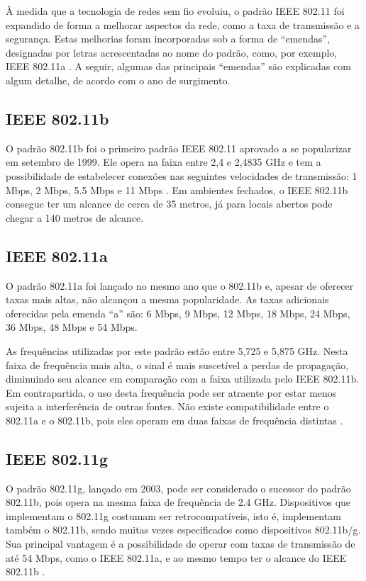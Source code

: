 À medida que a tecnologia de redes sem fio evoluiu, o padrão IEEE 802.11 foi expandido de forma a melhorar aspectos da rede, como a taxa de transmissão e a segurança. Estas melhorias foram incorporadas sob a forma de ``emendas'', designadas por letras acrescentadas ao nome do padrão, como, por exemplo, IEEE 802.11a \cite{fluminense2010}. A seguir, algumas das principais ``emendas'' são explicadas com algum detalhe, de acordo com o ano de surgimento.

\subsection{IEEE 802.11b}
\label{subsec:802-11b}

O padrão 802.11b foi o primeiro padrão IEEE 802.11 aprovado a se popularizar em setembro de 1999. Ele opera na faixa entre 2,4 e 2,4835 GHz e tem a possibilidade de estabelecer conexões nas seguintes velocidades de transmissão: 1 Mbps, 2 Mbps, 5.5 Mbps e 11 Mbps \cite{moraes2010,fluminense2010}. Em ambientes fechados, o IEEE 802.11b consegue ter um alcance de cerca de 35 metros, já para locais abertos pode chegar a 140 metros de alcance.

\subsection{IEEE 802.11a}
\label{802-11a}

O padrão 802.11a foi lançado no mesmo ano que o 802.11b e, apesar de oferecer taxas mais altas, não alcançou a mesma popularidade. As taxas adicionais oferecidas pela emenda ``a'' são: 6 Mbps, 9 Mbps, 12 Mbps, 18 Mbps, 24 Mbps, 36 Mbps, 48 Mbps e 54 Mbps.

As frequências utilizadas por este padrão estão entre 5,725 e 5,875 GHz. Nesta faixa de frequência mais alta, o sinal é mais suscetível a perdas de propagação, diminuindo seu alcance em comparação com a faixa utilizada pelo IEEE 802.11b. Em contrapartida, o uso desta frequência pode ser atraente por estar menos sujeita a interferência de outras fontes. Não existe compatibilidade entre o 802.11a e o 802.11b, pois eles operam em duas faixas de frequência distintas \cite{moraes2010,fluminense2010}.

\subsection{IEEE 802.11g}
\label{subsec:802-11g}

O padrão 802.11g, lançado em 2003, pode ser considerado o sucessor do padrão 802.11b, pois opera na mesma faixa de frequência de 2.4 GHz. Dispositivos que implementam o 802.11g costumam ser retrocompatíveis, isto é, implementam também o 802.11b, sendo muitas vezes especificados como dispositivos 802.11b/g. Sua principal vantagem é a possibilidade de operar com taxas de transmissão de até 54 Mbps, como o IEEE 802.11a, e ao mesmo tempo ter o alcance do IEEE 802.11b \cite{moraes2010,fluminense2010}.

